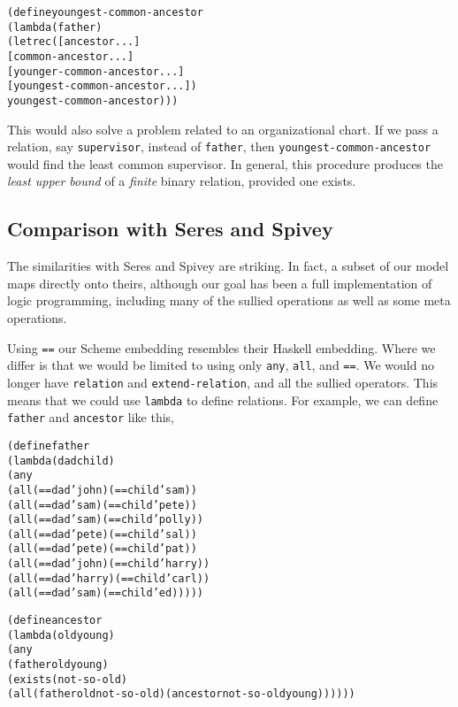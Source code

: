 \begin{alltt}
(define youngest-common-ancestor
  (lambda (father)
    (letrec ([ancestor ...]
             [common-ancestor ...]
             [younger-common-ancestor ...]
             [youngest-common-ancestor ...])
      youngest-common-ancestor)))
\end{alltt}  

\noindent
This would also solve a problem related to an organizational chart.
If we pass a relation, say \texttt{supervisor}, instead of
\texttt{father}, then \texttt{youngest-common-ancestor} would find the
least common supervisor.  In general, this procedure produces the
\emph{least upper bound} of a \emph{finite} binary relation, provided one
exists.

\subsection{Comparison with Seres and Spivey}
The similarities with Seres and Spivey are striking.  In fact, a
subset of our model maps directly onto theirs, although our goal
has been a full implementation of logic programming, including
many of the sullied operations as well as some meta operations.

Using \texttt{==} our Scheme embedding resembles their Haskell
embedding.  Where we differ is that we would be limited to using only
\texttt{any}, \texttt{all}, and \texttt{==}.  We would no longer have
\texttt{relation} and \texttt{extend-relation}, and all the sullied
operators.  This means that we could use \texttt{lambda} to define
relations.  For example, we can define \texttt{father} and
\texttt{ancestor} like this,

\begin{alltt}
(define father
  (lambda (dad child)
    (any
      (all (== dad 'john) (== child 'sam))
      (all (== dad 'sam) (== child 'pete))
      (all (== dad 'sam) (== child 'polly))
      (all (== dad 'pete) (== child 'sal))
      (all (== dad 'pete) (== child 'pat))
      (all (== dad 'john) (== child 'harry))
      (all (== dad 'harry) (== child 'carl))
      (all (== dad 'sam) (== child 'ed)))))
\end{alltt}

\begin{alltt}
(define ancestor
  (lambda (old young)
    (any
      (father old young)
      (exists (not-so-old)
        (all (father old not-so-old) (ancestor not-so-old young))))))
\end{alltt}

